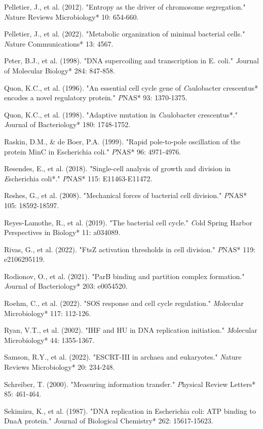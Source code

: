 \documentclass[11pt,a4paper]{article}
\begin{document}
Pelletier, J., et al. (2012). "Entropy as the driver of chromosome segregation." \textit*Nature Reviews Microbiology* 10: 654-660.

Pelletier, J., et al. (2022). "Metabolic organization of minimal bacterial cells." \textit*Nature Communications* 13: 4567.

Peter, B.J., et al. (1998). "DNA supercoiling and transcription in E. coli." \textit*Journal of Molecular Biology* 284: 847-858.

Quon, K.C., et al. (1996). "An essential cell cycle gene of \textit*Caulobacter crescentus* encodes a novel regulatory protein." \textit*PNAS* 93: 1370-1375.

Quon, K.C., et al. (1998). "Adaptive mutation in \textit*Caulobacter crescentus*." \textit*Journal of Bacteriology* 180: 1748-1752.

Raskin, D.M., & de Boer, P.A. (1999). "Rapid pole-to-pole oscillation of the protein MinC in Escherichia coli." \textit*PNAS* 96: 4971-4976.

Resendes, E., et al. (2018). "Single-cell analysis of growth and division in \textit*Escherichia coli*." \textit*PNAS* 115: E11463-E11472.

Reshes, G., et al. (2008). "Mechanical forces of bacterial cell division." \textit*PNAS* 105: 18592-18597.

Reyes-Lamothe, R., et al. (2019). "The bacterial cell cycle." \textit*Cold Spring Harbor Perspectives in Biology* 11: a034089.

Rivas, G., et al. (2022). "FtsZ activation thresholds in cell division." \textit*PNAS* 119: e2106295119.

Rodionov, O., et al. (2021). "ParB binding and partition complex formation." \textit*Journal of Bacteriology* 203: e0054520.

Roehm, C., et al. (2022). "SOS response and cell cycle regulation." \textit*Molecular Microbiology* 117: 112-126.

Ryan, V.T., et al. (2002). "IHF and HU in DNA replication initiation." \textit*Molecular Microbiology* 44: 1355-1367.

Samson, R.Y., et al. (2022). "ESCRT-III in archaea and eukaryotes." \textit*Nature Reviews Microbiology* 20: 234-248.

Schreiber, T. (2000). "Measuring information transfer." \textit*Physical Review Letters* 85: 461-464.

Sekimizu, K., et al. (1987). "DNA replication in Escherichia coli: ATP binding to DnaA protein." \textit*Journal of Biological Chemistry* 262: 15617-15623.
\end{document}
